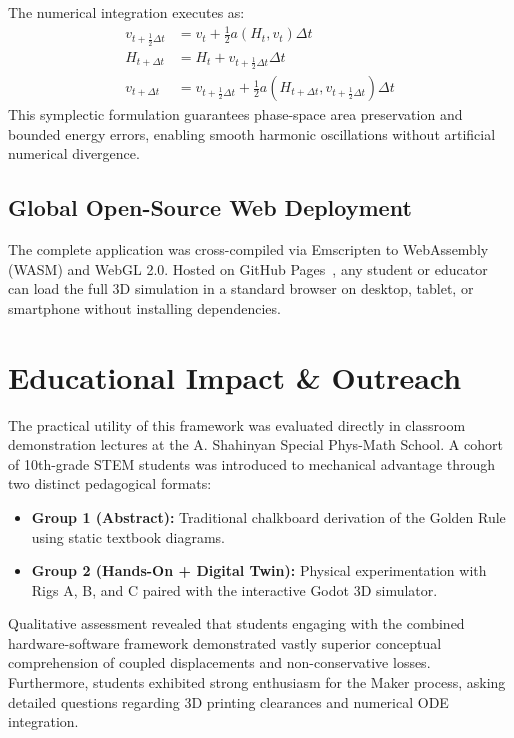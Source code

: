 \documentclass[10pt,twocolumn]{article}
\begin{document}
The numerical integration executes as:
\begin{align}
    v_{t + \frac{1}{2}\Delta t} &= v_t + \frac{1}{2} a(H_t, v_t) \Delta t \\
    H_{t + \Delta t} &= H_t + v_{t + \frac{1}{2}\Delta t} \Delta t \\
    v_{t + \Delta t} &= v_{t + \frac{1}{2}\Delta t} + \frac{1}{2} a(H_{t + \Delta t}, v_{t + \frac{1}{2}\Delta t}) \Delta t
\end{align}
This symplectic formulation guarantees phase-space area preservation and bounded energy errors, enabling smooth harmonic oscillations without artificial numerical divergence.

\subsection{Global Open-Source Web Deployment}

The complete application was cross-compiled via Emscripten to WebAssembly (WASM) and WebGL 2.0. Hosted on GitHub Pages~\cite{ghardashyan_live_demo}, any student or educator can load the full 3D simulation in a standard browser on desktop, tablet, or smartphone without installing dependencies.

\section{Educational Impact \& Outreach}

The practical utility of this framework was evaluated directly in classroom demonstration lectures at the A. Shahinyan Special Phys-Math School. A cohort of 10th-grade STEM students was introduced to mechanical advantage through two distinct pedagogical formats:
\begin{itemize}
    \item \textbf{Group 1 (Abstract):} Traditional chalkboard derivation of the Golden Rule using static textbook diagrams.
    \item \textbf{Group 2 (Hands-On + Digital Twin):} Physical experimentation with Rigs A, B, and C paired with the interactive Godot 3D simulator.
\end{itemize}

Qualitative assessment revealed that students engaging with the combined hardware-software framework demonstrated vastly superior conceptual comprehension of coupled displacements and non-conservative losses. Furthermore, students exhibited strong enthusiasm for the Maker process, asking detailed questions regarding 3D printing clearances and numerical ODE integration.
\end{document}
